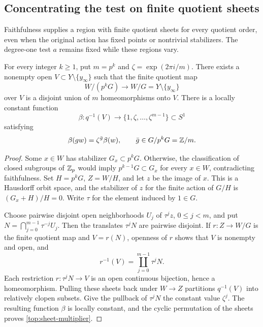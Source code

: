 \subsection{Concentrating the test on finite quotient sheets}

Faithfulness supplies a region with finite quotient sheets for every
quotient order, even when the original action has fixed points or
nontrivial stabilizers.  The degree-one test $a$ remains fixed while
these regions vary.

\begin{lemma}
\label{lem:finite-sheets}
For every integer $k\ge1$, put $m=p^k$ and
$\zeta=\exp(2\pi i/m)$.  There exists a nonempty open
$V\subset Y\setminus\{y_\infty\}$ such that the finite quotient
map
\[
 W/(p^kG)\longrightarrow W/G=Y\setminus\{y_\infty\}
\]
over $V$ is a disjoint union of $m$ homeomorphisms onto $V$.
There is a locally constant function
\[
 \beta:q^{-1}(V)\longrightarrow\{1,\zeta,\ldots,\zeta^{m-1}\}
 \subset S^1
\]
satisfying
\begin{equation}
 \beta(gw)=\zeta^{\bar g}\beta(w),
 \qquad \bar g\in G/p^kG=\mathbb Z/m.
 \label{top:sheet-multiplier}
\end{equation}
\end{lemma}

\begin{proof}
Some $x\in W$ has stabilizer $G_x\subset p^kG$.  Otherwise,
the classification of closed subgroups of $\mathbb Z_p$ would imply
$p^{k-1}G\subset G_x$ for every $x\in W$, contradicting
faithfulness.  Set $H=p^kG$, $Z=W/H$, and let $z$ be the image
of $x$.  This is a Hausdorff orbit space, and the stabilizer of
$z$ for the finite action of $G/H$ is
$(G_x+H)/H=0$.  Write $\tau$ for the element induced by $1\in G$.

Choose pairwise disjoint open neighborhoods $U_j$ of
$\tau^jz$, $0\le j<m$, and put
$N=\bigcap_{j=0}^{m-1}\tau^{-j}U_j$.  Then the translates
$\tau^jN$ are pairwise disjoint.  If $r:Z\to W/G$ is the
finite quotient map and $V=r(N)$, openness of $r$ shows that
$V$ is nonempty and open, and
\[
 r^{-1}(V)=\coprod_{j=0}^{m-1}\tau^jN.
\]
Each restriction $r:\tau^jN\to V$ is an open continuous
bijection, hence a homeomorphism.  Pulling these sheets back under
$W\to Z$ partitions $q^{-1}(V)$ into relatively clopen subsets.
Give the pullback of $\tau^jN$ the constant value $\zeta^j$.
The resulting function $\beta$ is locally constant, and the cyclic
permutation of the sheets proves
\eqref{top:sheet-multiplier}.
\end{proof}

